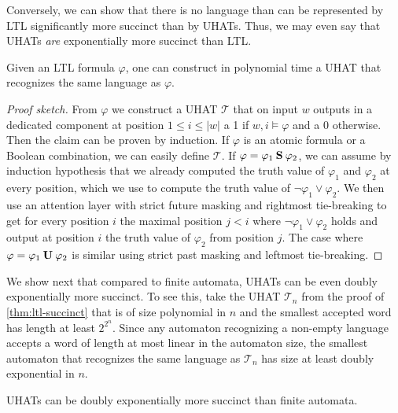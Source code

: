 Conversely, we can show that there is no language than can be represented by LTL significantly more succinct than by UHATs.
Thus, we may even say that UHATs \emph{are} exponentially more succinct than LTL.

\begin{proposition}\label{lem:ltl-uhat}
Given an LTL formula $\varphi$, one can construct in polynomial time a UHAT that recognizes the same language as $\varphi$.
\end{proposition}
\begin{proof}[Proof sketch]
From $\varphi$ we construct a UHAT $\mathcal{T}$ that on input $w$ outputs in a dedicated component at position $1 \le i \le |w|$
a 1 if $w,i \models \varphi$ and a 0 otherwise.
Then the claim can be proven by induction.
If $\varphi$ is an atomic formula or a Boolean combination, we can easily define $\mathcal{T}$.
If $\varphi = \varphi_1 \mathbin{\textbf{S}} \varphi_2$, 
we can assume by induction hypothesis that we already computed the truth value of $\varphi_1$ and $\varphi_2$ at every position,
which we use to compute the truth value of $\neg\varphi_1 \vee \varphi_2$.
We then use an attention layer with strict future masking and rightmost tie-breaking 
to get for every position $i$ the maximal position $j < i$ where $\neg\varphi_1 \vee \varphi_2$ holds and
output at position $i$ the truth value of $\varphi_2$ from position $j$.
The case where $\varphi = \varphi_1 \mathbin{\textbf{U}} \varphi_2$ is similar using strict past masking and leftmost tie-breaking.
\end{proof}

We show next that compared to finite automata, UHATs can be even doubly exponentially more succinct.
To see this, take the UHAT $\mathcal{T}_n$ from the proof of \cref{thm:ltl-succinct}
that is of size polynomial in $n$ and the smallest accepted word has length at least $2^{2^n}$.
Since any automaton recognizing a non-empty language accepts a word of length at most linear in the automaton size,
the smallest automaton that recognizes the same language as $\mathcal{T}_n$ has size at least doubly exponential in $n$.

\begin{theorem}\label{thm:automata-succinct}
UHATs can be doubly exponentially more succinct than finite automata.
\end{theorem}

